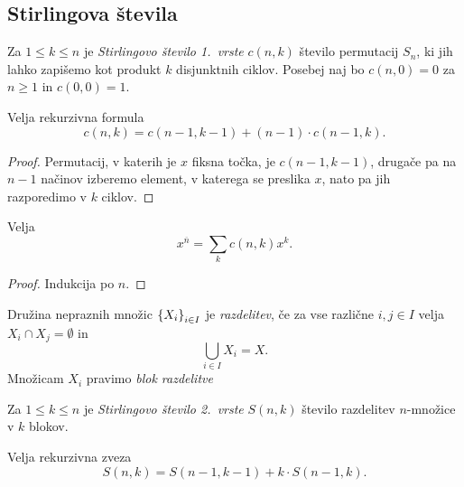 \obvs

\newpage

\subsection{Stirlingova števila}

\begin{definicija}
Za $1 \leq k \leq n$ je
\emph{Stirlingovo število 1.~vrste}
$c(n,k)$ število permutacij $S_n$, ki jih lahko zapišemo kot
produkt $k$ disjunktnih ciklov. Posebej naj bo $c(n,0) = 0$ za
$n \geq 1$ in $c(0,0) = 1$.
\end{definicija}


\begin{trditev}
Velja rekurzivna formula
\[
c(n, k) = c(n-1, k-1) + (n-1) \cdot c(n-1, k).
\]
\end{trditev}

\begin{proof}
Permutacij, v katerih je $x$ fiksna točka, je $c(n-1, k-1)$,
drugače pa na $n-1$ načinov izberemo element, v katerega se
preslika $x$, nato pa jih razporedimo v $k$ ciklov.
\end{proof}

\begin{izrek}
Velja
\[
x^{\overline{n}} = \sum_k c(n, k) x^k.
\]
\end{izrek}

\begin{proof}
Indukcija po $n$.
\end{proof}

\begin{definicija}
Družina nepraznih množic $\left\{X_i\right\}_{i \in I}$ je
\emph{razdelitev}, če za vse različne
$i, j \in I$ velja $X_i \cap X_j = \emptyset$ in
\[
\bigcup_{i \in I} X_i = X.
\]
Množicam $X_i$ pravimo \emph{blok razdelitve}
\end{definicija}

\begin{definicija}
Za $1 \leq k \leq n$ je
\emph{Stirlingovo število 2.~vrste}
$S(n, k)$ število razdelitev $n$-množice v $k$ blokov.
\end{definicija}

\begin{trditev}
Velja rekurzivna zveza
\[
S(n,k) = S(n-1, k-1) + k \cdot S(n-1, k).
\]
\end{trditev}

